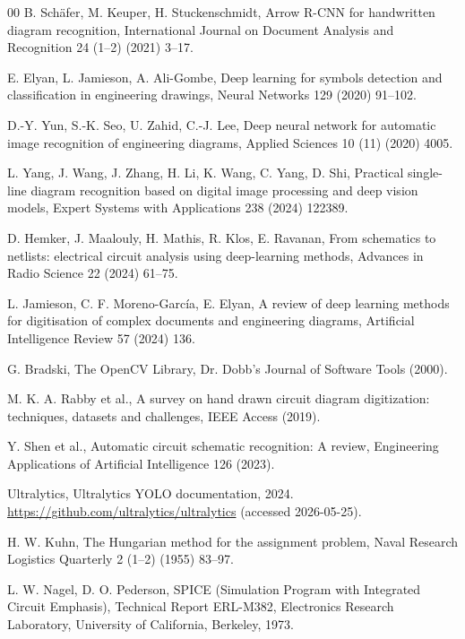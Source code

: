 \begin{thebibliography}{00}
B. Sch{\"a}fer, M. Keuper, H. Stuckenschmidt, Arrow R-CNN for handwritten diagram recognition, International Journal on Document Analysis and Recognition 24 (1--2) (2021) 3--17.

E. Elyan, L. Jamieson, A. Ali-Gombe, Deep learning for symbols detection and classification in engineering drawings, Neural Networks 129 (2020) 91--102.

D.-Y. Yun, S.-K. Seo, U. Zahid, C.-J. Lee, Deep neural network for automatic image recognition of engineering diagrams, Applied Sciences 10 (11) (2020) 4005.

L. Yang, J. Wang, J. Zhang, H. Li, K. Wang, C. Yang, D. Shi, Practical single-line diagram recognition based on digital image processing and deep vision models, Expert Systems with Applications 238 (2024) 122389.

D. Hemker, J. Maalouly, H. Mathis, R. Klos, E. Ravanan, From schematics to netlists: electrical circuit analysis using deep-learning methods, Advances in Radio Science 22 (2024) 61--75.

L. Jamieson, C. F. Moreno-Garc{\'i}a, E. Elyan, A review of deep learning methods for digitisation of complex documents and engineering diagrams, Artificial Intelligence Review 57 (2024) 136.

G. Bradski, The OpenCV Library, Dr. Dobb's Journal of Software Tools (2000).

M. K. A. Rabby et al., A survey on hand drawn circuit diagram digitization: techniques, datasets and challenges, IEEE Access (2019).

Y. Shen et al., Automatic circuit schematic recognition: A review, Engineering Applications of Artificial Intelligence 126 (2023).

Ultralytics, Ultralytics YOLO documentation, 2024. \url{https://github.com/ultralytics/ultralytics} (accessed 2026-05-25).

H. W. Kuhn, The Hungarian method for the assignment problem, Naval Research Logistics Quarterly 2 (1--2) (1955) 83--97.

L. W. Nagel, D. O. Pederson, SPICE (Simulation Program with Integrated Circuit Emphasis), Technical Report ERL-M382, Electronics Research Laboratory, University of California, Berkeley, 1973.

\end{thebibliography}
